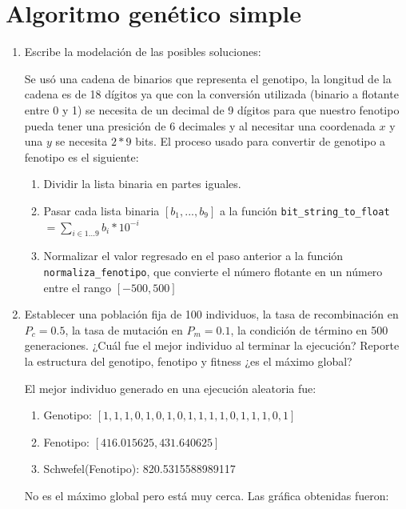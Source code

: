 \documentclass[11pt,letterpaper]{article}
\begin{document}
    \section{Algoritmo genético simple}
    \begin{enumerate}[label=\alph*)]
        \item Escribe la modelación de las posibles soluciones:
        
        Se usó una cadena de binarios que representa el genotipo, la longitud de la cadena es de 18 dígitos ya que con la conversión utilizada (binario a flotante entre 0 y 1) se necesita de un decimal de 9 dígitos para que nuestro fenotipo pueda tener una presición de 6 decimales y al necesitar una coordenada $x$ y una $y$ se necesita $2*9$ bits. El proceso usado para convertir de genotipo a fenotipo es el siguiente:
        \begin{enumerate}[label=\arabic*.]
            \item Dividir la lista binaria en partes iguales.
            \item Pasar cada lista binaria $[b_1, ..., b_9]$ a la función \texttt{bit\_string\_to\_float} $= \sum_{i \in 1...9} b_i * 10^{-i}$
            \item Normalizar el valor regresado en el paso anterior a la función \texttt{normaliza\_fenotipo}, que convierte el número flotante en un número entre el rango $[-500, 500]$
        \end{enumerate}

        \item Establecer una población fija de 100 individuos, la tasa de recombinación en $P_c =0.5$, la tasa de mutación en $P_m=0.1$, la condición de término en 500 generaciones. ¿Cuál fue el mejor individuo al terminar la ejecución? Reporte la estructura del genotipo, fenotipo y fitness ¿es el máximo global?
        
        El mejor individuo generado en una ejecución aleatoria fue:
        \begin{enumerate}
            \item Genotipo:  $[1, 1, 1, 0, 1, 0, 1, 0, 1, 1, 1, 1, 0, 1, 1, 1, 0, 1]$
            \item Fenotipo:  $[416.015625, 431.640625]$
            \item Schwefel(Fenotipo):  820.5315588989117
        \end{enumerate}
        
        No es el máximo global pero está muy cerca. Las gráfica obtenidas fueron:
        

\end{enumerate}
\end{document}
